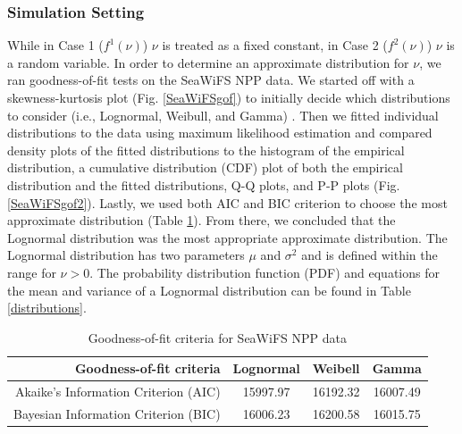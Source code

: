 \documentclass[oneside,12pt,final]{sty/ucthesis-CA2012}
\let\cite\citep                             %
\begin{document}
\begin{mainmatter}
\subsubsection{Simulation Setting}
While in Case 1 ($f^1(\nu)$) $\nu$ is treated as a fixed constant, in Case 2 ($f^2(\nu)$) $\nu$ is a random variable. In order to determine an approximate distribution for $\nu$, we ran goodness-of-fit tests on the SeaWiFS NPP data. We started off with a skewness-kurtosis plot (Fig. \ref{SeaWiFSgof}) to initially decide which distributions to consider (i.e., Lognormal, Weibull, and Gamma) \cite{fitdistrplus}. Then we fitted individual distributions to the data using maximum likelihood estimation and compared density plots of the fitted distributions to the histogram of the empirical distribution, a cumulative distribution (CDF) plot of both the empirical distribution and the fitted distributions, Q-Q plots, and P-P plots (Fig. \ref{SeaWiFSgof2}). Lastly, we used both AIC and BIC criterion to choose the most approximate distribution (Table \ref{seawifs_aic}). From there, we concluded that the Lognormal distribution was the most appropriate approximate distribution. The Lognormal distribution has two parameters $\mu$ and $\sigma^2$ and is defined within the range for $\nu > 0$. The probability distribution function (PDF) and equations for the mean and variance of a Lognormal distribution can be found in Table \ref{distributions}.

\begin{table}[H]
\centering
\caption{Goodness-of-fit criteria for SeaWiFS NPP data}
\begin{tabular}{r|c|c|c}
  \hline \small
 Goodness-of-fit criteria & Lognormal & Weibell & Gamma \\ 
   \hline
   Akaike's Information Criterion (AIC) & 15997.97 & 16192.32 & 16007.49 \\   
   Bayesian Information Criterion (BIC) & 16006.23 & 16200.58 & 16015.75 \\
   \hline
\end{tabular} 
\label{seawifs_aic}
\end{table}


\end{mainmatter}
\end{document}
